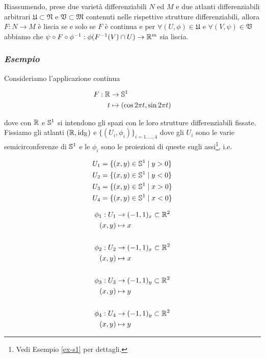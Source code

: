 Riassumendo, prese due varietà differenziabili $ N $ ed $ M $ e due atlanti differenziabili arbitrari $ \mathfrak{U} \subset \mathfrak{N} $ e $ \mathfrak{V} \subset \mathfrak{M} $ contenuti nelle rispettive strutture differenziabili, allora $ F : N \to M $ è liscia se e solo se $ F $ è continua e per $ \forall (U,\phi) \in \mathfrak{U} $ e $ \forall (V,\psi) \in \mathfrak{V} $ abbiamo che $ \psi \circ F \circ \phi^{-1} : \phi(F^{-1}(V) \cap U) \to \R^{m} $ sia liscia.

\subsubsection{\textit{Esempio}}

Consideriamo l'applicazione continua

\begin{align}
	\begin{split}
		F  : \R &\to \S^{1}\\
		t &\mapsto (\cos 2 \pi t, \sin 2 \pi t)
	\end{split}
\end{align}

dove con $ \R $ e $ \S^{1} $ si intendono gli spazi con le loro strutture differenziabili fissate.\\
Fissiamo gli atlanti $ (\R,\id_{\R}) $ e $ \{(U_{i},\phi_{i})\}_{i=1,\dots,4} $ dove gli $ U_{i} $ sono le varie semicirconferenze di $ \S^{1} $ e le $ \phi_{i} $ sono le proiezioni di queste sugli assi\footnote{%
	Vedi Esempio \ref{ex-s1} per dettagli.%
}, i.e.

\begin{align}
	\begin{split}
		U_{1} &= \{ (x,y) \in \S^{1} \mid y>0 \}\\
		U_{2} &= \{ (x,y) \in \S^{1} \mid y<0 \}\\
		U_{3} &= \{ (x,y) \in \S^{1} \mid x>0 \}\\
		U_{4} &= \{ (x,y) \in \S^{1} \mid x<0 \}
	\end{split}	
\end{align}

\begin{align}
	\begin{split}
		\phi_{1} : U_{1} &\to (-1,1)_{x} \subset \R^{2}\\
		(x,y) &\mapsto x\\\\
		\phi_{2} : U_{2} &\to (-1,1)_{x} \subset \R^{2}\\
		(x,y) &\mapsto x\\\\
		\phi_{3} : U_{3} &\to (-1,1)_{y} \subset \R^{2}\\
		(x,y) &\mapsto y\\\\
		\phi_{4} : U_{4} &\to (-1,1)_{y} \subset \R^{2}\\
		(x,y) &\mapsto y
	\end{split}
\end{align}

